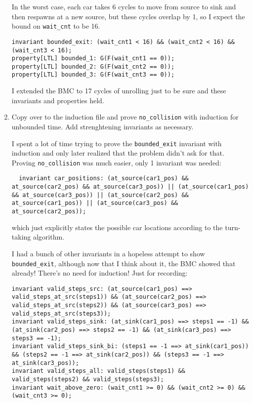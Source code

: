 \begin{enumerate}[label=(\alph*)]
    In the worst case, each car takes 6 cycles to move from source to sink and then respawns at a new source, but these cycles overlap by 1, so I expect the bound on \verb|wait_cnt| to be 16.

    \begin{verbatim}
invariant bounded_exit: (wait_cnt1 < 16) && (wait_cnt2 < 16) && (wait_cnt3 < 16);
property[LTL] bounded_1: G(F(wait_cnt1 == 0));
property[LTL] bounded_2: G(F(wait_cnt2 == 0));
property[LTL] bounded_3: G(F(wait_cnt3 == 0));
    \end{verbatim}

    I extended the BMC to 17 cycles of unrolling just to be sure and these invariants and properties held.

  \item {\color{blue}Copy over to the induction file and prove \verb|no_collision| with induction for unbounded time. Add strenghtening invariants as necessary.}

    I spent a lot of time trying to prove the \verb|bounded_exit| invariant with induction and only later realized that the problem didn't ask for that. Proving \verb|no_collision| was much easier, only 1 invariant was needed:

    \begin{verbatim}
  invariant car_positions: (at_source(car1_pos) && at_source(car2_pos) && at_source(car3_pos)) || (at_source(car1_pos) && at_source(car3_pos)) || (at_source(car2_pos) && at_source(car1_pos)) || (at_source(car3_pos) && at_source(car2_pos));
    \end{verbatim}

    which just explicitly states the possible car locations according to the turn-taking algorithm.

    I had a bunch of other invariants in a hopeless attempt to show \verb|bounded_exit|, although now that I think about it, the BMC showed that already! There's no need for induction! Just for recording:

    \begin{verbatim}
invariant valid_steps_src: (at_source(car1_pos) ==> valid_steps_at_src(steps1)) && (at_source(car2_pos) ==> valid_steps_at_src(steps2)) && (at_source(car3_pos) ==> valid_steps_at_src(steps3));
invariant valid_steps_sink: (at_sink(car1_pos) ==> steps1 == -1) && (at_sink(car2_pos) ==> steps2 == -1) && (at_sink(car3_pos) ==> steps3 == -1);
invariant valid_steps_sink_bi: (steps1 == -1 ==> at_sink(car1_pos)) && (steps2 == -1 ==> at_sink(car2_pos)) && (steps3 == -1 ==> at_sink(car3_pos));
invariant valid_steps_all: valid_steps(steps1) && valid_steps(steps2) && valid_steps(steps3);
invariant wait_above_zero: (wait_cnt1 >= 0) && (wait_cnt2 >= 0) && (wait_cnt3 >= 0);
    \end{verbatim}
\end{enumerate}

